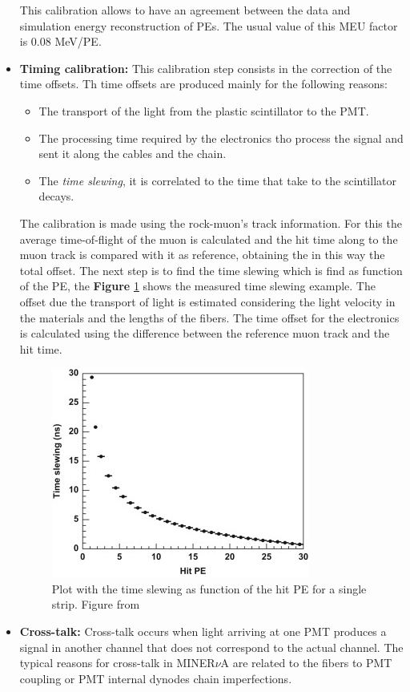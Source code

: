 \begin{itemize}
    This calibration allows to have an agreement between the data and simulation energy reconstruction of PEs. The usual value of this MEU factor is 0.08 MeV/PE.
    \item \textbf{Timing calibration:} This calibration step consists in the correction of the time offsets. Th time offsets are produced mainly for the following reasons:
    \begin{itemize}
        \item The transport of the light from the plastic scintillator to the PMT.
        \item The processing time required by the electronics tho process the signal and sent it along the cables and the chain.  
        \item The \textit{time slewing}, it is correlated to the time that take to the scintillator decays.
    \end{itemize}

    The calibration is made using the rock-muon's track information. For this the average time-of-flight of the muon is calculated and the hit time along to the muon track is compared with it as reference, obtaining the in this way the total offset. The next step is to find the time slewing which is find as function of the PE, the \textbf{Figure} \ref{fig:MnvExp:MnvDetector:Calibration:InSitu:SlewingFunc} shows the measured time slewing example. The offset due the transport of light is estimated considering the light velocity in the materials and the lengths of the fibers. The time offset for the electronics is calculated using the difference between the reference muon track and the hit time.  
    \begin{figure}[!htb]
        \centering
        \includegraphics{Figures/Chapter2/SlewingFunction.jpg}
        \caption{Plot with the time slewing as function of the hit PE for a single strip. Figure from \cite{MINERvA}}
        \label{fig:MnvExp:MnvDetector:Calibration:InSitu:SlewingFunc}
    \end{figure}
    \item \textbf{Cross-talk:} Cross-talk occurs when light arriving at one PMT produces a signal in another channel that does not correspond to the actual channel. The typical reasons for cross-talk in MINER$\nu$A are related to the fibers to PMT coupling or PMT internal dynodes chain imperfections.


\end{itemize}
